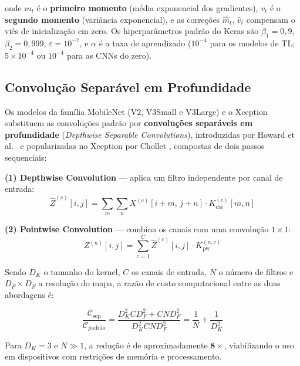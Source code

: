 \documentclass[12pt,a4paper]{article}
\begin{document}
onde $m_t$ é o \textbf{primeiro momento} (média exponencial dos gradientes),
$v_t$ é o \textbf{segundo momento} (variância exponencial), e as correções
$\hat{m}_t$, $\hat{v}_t$ compensam o viés de inicialização em zero.
Os hiperparâmetros padrão do Keras são
$\beta_1 = 0{,}9$, $\beta_2 = 0{,}999$, $\varepsilon = 10^{-7}$, e $\alpha$
é a taxa de aprendizado ($10^{-4}$ para os modelos de TL;
$5\times10^{-4}$ ou $10^{-4}$ para as CNNs do zero).

\subsection{Convolução Separável em Profundidade}

Os modelos da família MobileNet (V2, V3Small e V3Large) e o Xception
substituem as convoluções padrão por \textbf{convoluções separáveis em
profundidade} (\emph{Depthwise Separable Convolutions}), introduzidas por
Howard et al.\ \cite{howard2017mobilenets} e popularizadas no Xception por
Chollet \cite{chollet2017xception}, compostas de dois passos sequenciais:

\textbf{(1) Depthwise Convolution} --- aplica um filtro independente por canal de entrada:
\begin{equation}
  \hat{Z}^{(c)}[i,j]
  = \sum_{m}\sum_{n} X^{(c)}[i+m,\,j+n]\cdot K_{\mathrm{dw}}^{(c)}[m,n]
  \label{eq:depthwise}
\end{equation}

\textbf{(2) Pointwise Convolution} --- combina os canais com uma convolução $1\times1$:
\begin{equation}
  Z^{(n)}[i,j] = \sum_{c=1}^{C}\hat{Z}^{(c)}[i,j]\cdot K_{\mathrm{pw}}^{(n,c)}
  \label{eq:pointwise}
\end{equation}

Sendo $D_K$ o tamanho do kernel, $C$ os canais de entrada, $N$ o número de
filtros e $D_F\times D_F$ a resolução do mapa, a razão de custo
computacional entre as duas abordagens é:

\begin{equation}
  \frac{\mathcal{C}_{\mathrm{sep}}}{\mathcal{C}_{\mathrm{padrão}}}
  = \frac{D_K^2 C D_F^2 + C N D_F^2}{D_K^2 C N D_F^2}
  = \frac{1}{N} + \frac{1}{D_K^2}
  \label{eq:dw_ratio}
\end{equation}

Para $D_K = 3$ e $N \gg 1$, a redução é de aproximadamente $\mathbf{8\times}$,
viabilizando o uso em dispositivos com restrições de memória e processamento.
\end{document}
